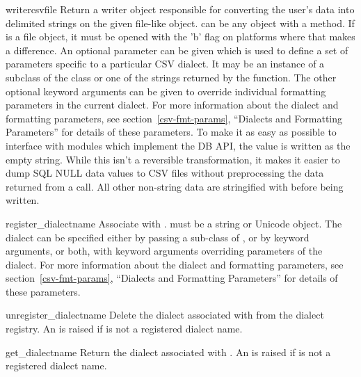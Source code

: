\begin{funcdesc}{writer}{csvfile}
Return a writer object responsible for converting the user's data into
delimited strings on the given file-like object.   can be any
object with a  method.  If  is a file object,
it must be opened with the 'b' flag on platforms where that makes a
difference.  An optional
{} parameter can be given which is used to define a set of
parameters specific to a particular CSV dialect.  It may be an instance
of a subclass of the  class or one of the strings
returned by the  function.  The other optional
{} keyword arguments can be given to override individual
formatting parameters in the current dialect.  For more information
about the dialect and formatting parameters, see
section~\ref{csv-fmt-params}, ``Dialects and Formatting Parameters'' for
details of these parameters.  To make it as easy as possible to
interface with modules which implement the DB API, the value
 is written as the empty string.  While this isn't a
reversible transformation, it makes it easier to dump SQL NULL data values
to CSV files without preprocessing the data returned from a
 call.  All other non-string data are stringified
with  before being written.
\end{funcdesc}

\begin{funcdesc}{register_dialect}{name}
Associate  with .   must be a string
or Unicode object. The dialect can be specified either by passing a
sub-class of , or by  keyword arguments,
or both, with keyword arguments overriding parameters of the dialect.
For more information about the dialect and formatting parameters, see
section~\ref{csv-fmt-params}, ``Dialects and Formatting Parameters''
for details of these parameters.
\end{funcdesc}

\begin{funcdesc}{unregister_dialect}{name}
Delete the dialect associated with  from the dialect registry.  An
 is raised if  is not a registered dialect
name.
\end{funcdesc}

\begin{funcdesc}{get_dialect}{name}
Return the dialect associated with .  An  is
raised if  is not a registered dialect name.
\end{funcdesc}

